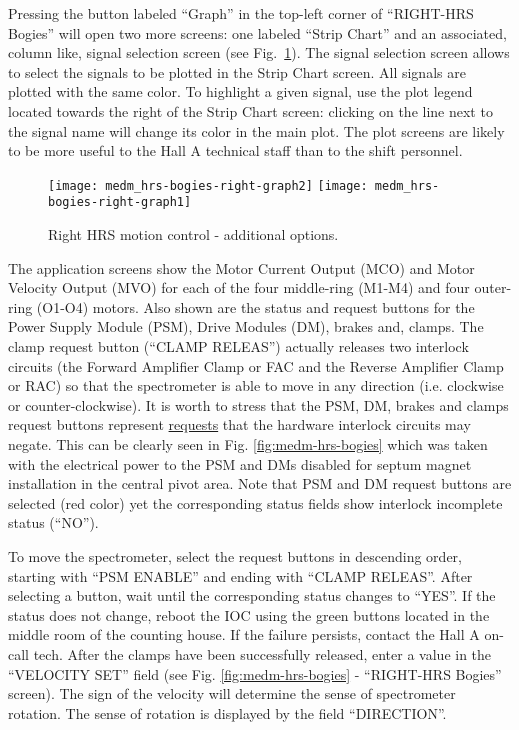 {Pressing the button labeled ``Graph'' in the top-left corner of ``RIGHT-HRS Bogies''
will open two more screens: one labeled ``Strip Chart'' and an associated, column like,
signal selection screen (see Fig.~\ref{fig:medm-hrs-bogies-graph}).
The signal selection screen allows to select the signals
to be plotted in the Strip Chart screen. All signals are plotted with the same color.
To highlight a given signal,
use the plot legend located towards the right of the Strip Chart screen: clicking on the line next
to the signal name will change its color in the main plot.
The plot screens are likely to be more useful to the Hall A technical staff than to the
shift personnel.
\begin{figure}[htb]
\begin{center}
    \texttt{[image: medm\_hrs-bogies-right-graph2]}
    \texttt{[image: medm\_hrs-bogies-right-graph1]}
\caption[Right HRS Motion Control - additional options]{Right HRS motion control - additional options.}
\label{fig:medm-hrs-bogies-graph}
\end{center}
\end{figure}


The application screens show the Motor Current Output (MCO) and Motor Velocity Output (MVO) for each
of the four middle-ring (M1-M4) and four outer-ring (O1-O4) motors.
Also shown are the status and request buttons for the Power Supply Module (PSM),
Drive Modules (DM),
brakes and, clamps. The clamp request button (``CLAMP RELEAS'') actually releases two interlock
circuits (the Forward Amplifier Clamp or FAC and the Reverse Amplifier Clamp or RAC)
so that the spectrometer is
able to move in any direction (i.e. clockwise or counter-clockwise).
It is worth to stress that the PSM, DM, brakes and clamps request buttons represent
\underline{requests} that the hardware interlock circuits may negate. This can be clearly
seen 
in Fig. \ref{fig:medm-hrs-bogies} which was taken with
the electrical power to the PSM and DMs disabled for septum magnet installation
in the central pivot area. Note that PSM and DM request buttons are selected (red color)
yet the corresponding status fields show interlock incomplete status (``NO'').

To move the spectrometer, select the request buttons in descending order, starting with
``PSM ENABLE'' and ending with ``CLAMP RELEAS''. After selecting a button, wait
until the corresponding status changes to ``YES''. 
If the status does not change, reboot
the IOC using the green buttons located in the middle room of the counting house.
If the failure persists, contact the Hall A on-call tech.
After the clamps have been successfully released, enter a value in the ``VELOCITY SET'' field
(see Fig. \ref{fig:medm-hrs-bogies} - ``RIGHT-HRS Bogies'' screen).
The sign of the velocity
will determine the sense of spectrometer rotation. The sense of rotation is displayed by the
field ``DIRECTION''.

}
